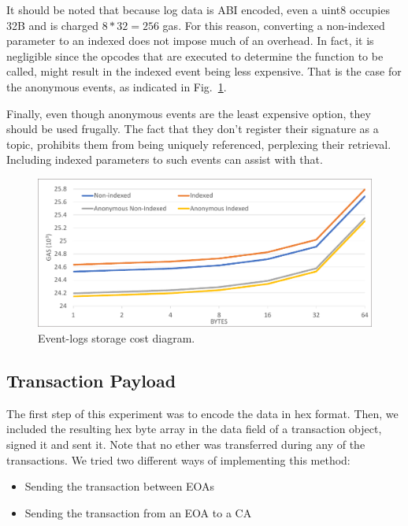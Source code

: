 It should be noted that because log data is ABI encoded, even a uint8 occupies 32B and is charged \( 8*32 = 256 \) gas. For this reason, converting a non-indexed parameter to an indexed does not impose much of an overhead. In fact, it is negligible since the opcodes that are executed to determine the function to be called, might result in the indexed event being less expensive. That is the case for the anonymous events, as indicated in Fig.~\ref{fig:logs}.

Finally, even though anonymous events are the least expensive option, they should be used frugally. The fact that they don’t register their signature as a topic, prohibits them from being uniquely referenced, perplexing their retrieval. Including indexed parameters to such events can assist with that.


\begin{figure}[htbp]
\centerline{\includegraphics[width=\textwidth]{figs/logs_1.pdf}}
\caption{Event-logs storage cost diagram.}
\label{fig:logs}
\end{figure}

\subsection{Transaction Payload}\label{subsection:evaluation_payload}
The first step of this experiment was to encode the data in hex format. Then, we included the resulting hex byte array in the data field of a transaction object, signed it and sent it. Note that no ether was transferred during any of the transactions. We tried two different ways of implementing this method:

\begin{itemize}[topsep=0pt, itemsep=0pt]
  \item Sending the transaction between EOAs
  \item Sending the transaction from an EOA to a CA
\end{itemize}


